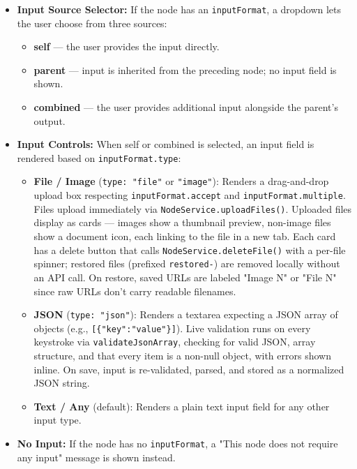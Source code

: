 \begin{itemize}
    \item \textbf{Input Source Selector:} If the node has an \texttt{inputFormat}, a dropdown lets the user choose from three sources:
    \begin{itemize}
        \item \textbf{self} --- the user provides the input directly.
        \item \textbf{parent} --- input is inherited from the preceding node; no input field is shown.
        \item \textbf{combined} --- the user provides additional input alongside the parent's output.
    \end{itemize}
    \item \textbf{Input Controls:} When self or combined is selected, an input field is rendered based on \texttt{inputFormat.type}:
    \begin{itemize}
        \item \textbf{File / Image} (\texttt{type: "file"} or \texttt{"image"}): Renders a drag-and-drop upload box respecting \texttt{inputFormat.accept} and \texttt{inputFormat.multiple}. Files upload immediately via \texttt{NodeService.uploadFiles()}. Uploaded files display as cards --- images show a thumbnail preview, non-image files show a document icon, each linking to the file in a new tab. Each card has a delete button that calls \texttt{NodeService.deleteFile()} with a per-file spinner; restored files (prefixed \texttt{restored-}) are removed locally without an API call. On restore, saved URLs are labeled "Image N" or "File N" since raw URLs don't carry readable filenames.
        \item \textbf{JSON} (\texttt{type: "json"}): Renders a textarea expecting a JSON array of objects (e.g., \texttt{[\{"key":"value"\}]}). Live validation runs on every keystroke via \texttt{validateJsonArray}, checking for valid JSON, array structure, and that every item is a non-null object, with errors shown inline. On save, input is re-validated, parsed, and stored as a normalized JSON string.
        \item \textbf{Text / Any} (default): Renders a plain text input field for any other input type.
    \end{itemize}
    \item \textbf{No Input:} If the node has no \texttt{inputFormat}, a "This node does not require any input" message is shown instead.
\end{itemize}

